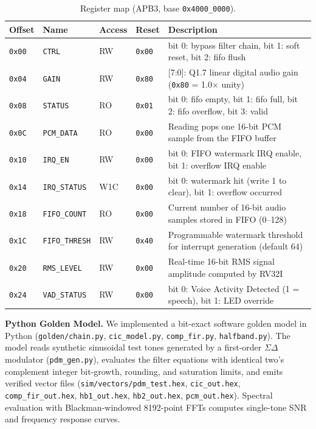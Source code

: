 \documentclass[11pt,a4paper]{article}
\begin{document}
\begin{table}[H]\centering\small
\caption{Register map (APB3, base \texttt{0x4000\_0000}).}\label{tab:regmap}
\begin{tabular}{@{}llllp{6.8cm}@{}}
\toprule
Offset & Name & Access & Reset & Description\\
\midrule
\texttt{0x00} & \texttt{CTRL}        & RW  & \texttt{0x00} & bit 0: bypass filter chain, bit 1: soft reset, bit 2: fifo flush \\
\texttt{0x04} & \texttt{GAIN}        & RW  & \texttt{0x80} & [7:0]: Q1.7 linear digital audio gain (\texttt{0x80} = 1.0$\times$ unity) \\
\texttt{0x08} & \texttt{STATUS}      & RO  & \texttt{0x01} & bit 0: fifo empty, bit 1: fifo full, bit 2: fifo overflow, bit 3: valid \\
\texttt{0x0C} & \texttt{PCM\_DATA}   & RO  & \texttt{0x00} & Reading pops one 16-bit PCM sample from the FIFO buffer \\
\texttt{0x10} & \texttt{IRQ\_EN}     & RW  & \texttt{0x00} & bit 0: FIFO watermark IRQ enable, bit 1: overflow IRQ enable \\
\texttt{0x14} & \texttt{IRQ\_STATUS} & W1C & \texttt{0x00} & bit 0: watermark hit (write 1 to clear), bit 1: overflow occurred \\
\texttt{0x18} & \texttt{FIFO\_COUNT} & RO  & \texttt{0x00} & Current number of 16-bit audio samples stored in FIFO (0--128) \\
\texttt{0x1C} & \texttt{FIFO\_THRESH}& RW  & \texttt{0x40} & Programmable watermark threshold for interrupt generation (default 64) \\
\texttt{0x20} & \texttt{RMS\_LEVEL}  & RW  & \texttt{0x00} & Real-time 16-bit RMS signal amplitude computed by RV32I \\
\texttt{0x24} & \texttt{VAD\_STATUS} & RW  & \texttt{0x00} & bit 0: Voice Activity Detected (1 = speech), bit 1: LED override \\
\bottomrule
\end{tabular}
\end{table}

\textbf{Python Golden Model.} We implemented a bit-exact software golden model in Python (\texttt{golden/chain.py}, \texttt{cic_model.py}, \texttt{comp_fir.py}, \texttt{halfband.py}). The model reads synthetic sinusoidal test tones generated by a first-order $\Sigma\Delta$ modulator (\texttt{pdm_gen.py}), evaluates the filter equations with identical two's complement integer bit-growth, rounding, and saturation limits, and emits verified vector files (\texttt{sim/vectors/pdm_test.hex}, \texttt{cic_out.hex}, \texttt{comp_fir_out.hex}, \texttt{hb1_out.hex}, \texttt{hb2_out.hex}, \texttt{pcm_out.hex}). Spectral evaluation with Blackman-windowed 8192-point FFTs computes single-tone SNR and frequency response curves.
\end{document}
